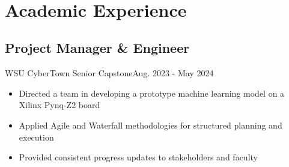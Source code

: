 \\ \section{Academic Experience}
\subsection{Project Manager \& Engineer}{WSU CyberTown Senior Capstone}{Aug. 2023 - May 2024}
\begin{itemize}
    \item Directed a team in developing a prototype machine learning model on a Xilinx Pynq-Z2 board
    \item Applied Agile and Waterfall methodologies for structured planning and execution
    \item Provided consistent progress updates to stakeholders and faculty
\end{itemize}
